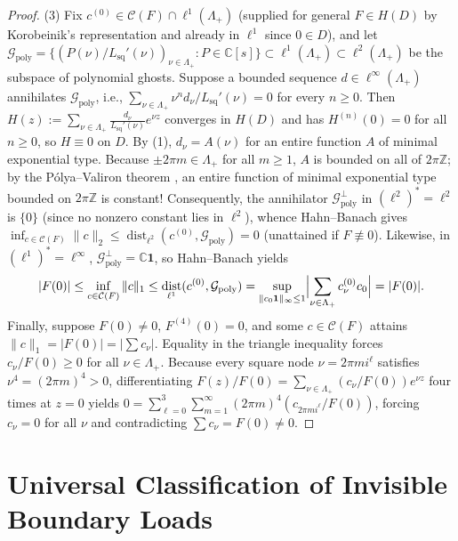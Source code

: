 \documentclass[11pt,reqno]{amsart}
\theoremstyle{definition}
\theoremstyle{remark}
\newcommand{\C}{\mathbb{C}}
\newcommand{\Z}{\mathbb{Z}}
\DeclareMathOperator{\dist}{dist}
\begin{document}
\begin{proof}
(3) Fix $c^{(0)} \in \mathcal{C}(F) \cap \ell^1(\Lambda_+)$ (supplied for general $F \in H(D)$ by Korobeinik's representation and already in $\ell^1$ since $0 \in D$), and let $\mathcal{G}_{\mathrm{poly}} = \{(P(\nu)/L_{\mathrm{sq}}'(\nu))_{\nu\in\Lambda_+} : P \in \C[s]\} \subset \ell^1(\Lambda_+) \subset \ell^2(\Lambda_+)$ be the subspace of polynomial ghosts. Suppose a bounded sequence $d \in \ell^\infty(\Lambda_+)$ annihilates $\mathcal{G}_{\mathrm{poly}}$, i.e., $\sum_{\nu\in\Lambda_+} \nu^n d_\nu / L_{\mathrm{sq}}'(\nu) = 0$ for every $n \ge 0$. Then $H(z) := \sum_{\nu\in\Lambda_+} \frac{d_\nu}{L_{\mathrm{sq}}'(\nu)} e^{\nu z}$ converges in $H(D)$ and has $H^{(n)}(0) = 0$ for all $n \ge 0$, so $H \equiv 0$ on $D$. By (1), $d_\nu = A(\nu)$ for an entire function $A$ of minimal exponential type. Because $\pm 2\pi m \in \Lambda_+$ for all $m \ge 1$, $A$ is bounded on all of $2\pi\Z$; by the P\'olya--Valiron theorem \cite[Theorem~10.2.3]{BoasBook}, an entire function of minimal exponential type bounded on $2\pi\Z$ is constant! Consequently, the annihilator $\mathcal{G}_{\mathrm{poly}}^\perp$ in $(\ell^2)^* = \ell^2$ is $\{0\}$ (since no nonzero constant lies in $\ell^2$), whence Hahn--Banach gives $\inf_{c\in\mathcal{C}(F)} \|c\|_2 \le \dist_{\ell^2}(c^{(0)}, \mathcal{G}_{\mathrm{poly}}) = 0$ (unattained if $F \not\equiv 0$). Likewise, in $(\ell^1)^* = \ell^\infty$, $\mathcal{G}_{\mathrm{poly}}^\perp = \C\mathbf{1}$, so Hahn--Banach yields
\[
  |F(0)| \le \inf_{c\in\mathcal{C}(F)} \|c\|_1 \le \dist_{\ell^1}(c^{(0)}, \mathcal{G}_{\mathrm{poly}})
  = \sup_{\|c_0\mathbf{1}\|_\infty \le 1} \Bigl|\sum_{\nu\in\Lambda_+} c_\nu^{(0)} c_0\Bigr| = |F(0)|.
\]
Finally, suppose $F(0) \ne 0$, $F^{(4)}(0) = 0$, and some $c \in \mathcal{C}(F)$ attains $\|c\|_1 = |F(0)| = |\sum c_\nu|$. Equality in the triangle inequality forces $c_\nu / F(0) \ge 0$ for all $\nu \in \Lambda_+$. Because every square node $\nu = 2\pi m i^\ell$ satisfies $\nu^4 = (2\pi m)^4 > 0$, differentiating $F(z)/F(0) = \sum_{\nu \in \Lambda_+} (c_\nu/F(0)) e^{\nu z}$ four times at $z = 0$ yields $0 = \sum_{\ell=0}^3 \sum_{m=1}^\infty (2\pi m)^4 (c_{2\pi m i^\ell}/F(0))$, forcing $c_\nu = 0$ for all $\nu$ and contradicting $\sum c_\nu = F(0) \ne 0$.
\end{proof}

\section{Universal Classification of Invisible Boundary Loads}\label{sec:classification}
\end{document}
